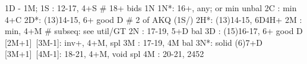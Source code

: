 1D - 1M;
1S : 12-17, 4+S  # 18+ bids 1N
1N*: 16+, any; or min unbal
2C : min 4+C
2D*: (13)14-15, 6+ good D  # 2 of AKQ
(1S/) 2H*: (13)14-15, 6D4H+ 
2M : min, 4+M  # subseq: see util/GT
2N : 17-19, 5+D bal
3D : (15)16-17, 6+ good D 
[2M+1]~[3M-1]: inv+, 4+M, spl
3M : 17-19, 4M bal
3N*: solid (6)7+D
[3M+1]~[4M-1]: 18-21, 4+M, void spl
4M : 20-21, 2452
